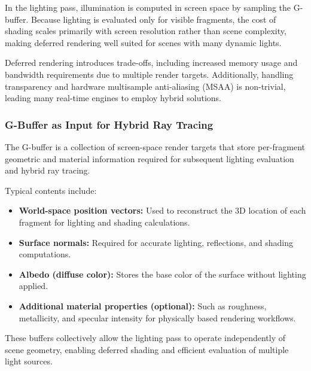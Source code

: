 \documentclass[12pt,a4paper]{report}
\begin{document}
In the lighting pass, illumination is computed in screen space by sampling the
G-buffer. Because lighting is evaluated only for visible fragments, the cost of
shading scales primarily with screen resolution rather than scene complexity,
making deferred rendering well suited for scenes with many dynamic lights.\cite{fernando2004gpugems}

Deferred rendering introduces trade-offs, including increased memory usage and
bandwidth requirements due to multiple render targets. Additionally, handling
transparency and hardware multisample anti-aliasing (MSAA) is non-trivial,
leading many real-time engines to employ hybrid solutions.
\cite{akenine2018realtimerendering, learnopengl}
\subsubsection{G-Buffer as Input for Hybrid Ray Tracing}
The G-buffer is a collection of screen-space render targets that store
per-fragment geometric and material information required for subsequent lighting
evaluation and hybrid ray tracing.

Typical contents include:
\begin{itemize}
    \item \textbf{World-space position vectors:} Used to reconstruct the 3D location of each fragment for lighting and shading calculations.
    \item \textbf{Surface normals:} Required for accurate lighting, reflections, and shading computations.
    \item \textbf{Albedo (diffuse color):} Stores the base color of the surface without lighting applied.
    \item \textbf{Additional material properties (optional):} Such as roughness, metallicity, and specular intensity for physically based rendering workflows.
\end{itemize}
\cite{akenine2018realtimerendering, learnopengl}
These buffers collectively allow the lighting pass to operate independently of scene geometry, enabling deferred shading and efficient evaluation of multiple light sources.\\
\end{document}
